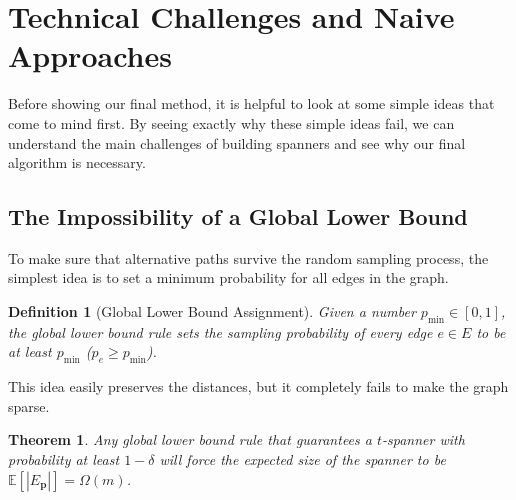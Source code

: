 \documentclass[11pt,a4paper]{article}
\newtheorem{definition}{Definition}[section]
\newtheorem{theorem}{Theorem}[section]
\newcommand{\E}{\mathbb{E}}
\begin{document}
\section{Technical Challenges and Naive Approaches}

Before showing our final method, it is helpful to look at some simple ideas that come to mind first. By seeing exactly why these simple ideas fail, we can understand the main challenges of building spanners and see why our final algorithm is necessary.

\subsection{The Impossibility of a Global Lower Bound}
To make sure that alternative paths survive the random sampling process, the simplest idea is to set a minimum probability for all edges in the graph.

\begin{definition}[Global Lower Bound Assignment]
Given a number $p_{\min} \in [0,1]$, the global lower bound rule sets the sampling probability of every edge $e \in E$ to be at least $p_{\min}$ ($p_e \ge p_{\min}$).
\end{definition}

This idea easily preserves the distances, but it completely fails to make the graph sparse.

\begin{theorem}\label{thm:global_lower_bound}
Any global lower bound rule that guarantees a $t$-spanner with probability at least $1 - \delta$ will force the expected size of the spanner to be $\E[|E_{\mathbf{p}}|] = \Omega(m)$.
\end{theorem}
\end{document}
